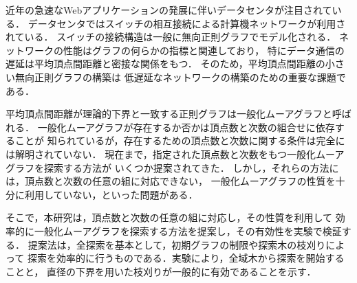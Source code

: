 
近年の急速なWebアプリケーションの発展に伴いデータセンタが注目されている．
データセンタではスイッチの相互接続による計算機ネットワークが利用されている．
スイッチの接続構造は一般に無向正則グラフでモデル化される．
ネットワークの性能はグラフの何らかの指標と関連しており，
特にデータ通信の遅延は平均頂点間距離と密接な関係をもつ．
そのため，平均頂点間距離の小さい無向正則グラフの構築は
低遅延なネットワークの構築のための重要な課題である．

平均頂点間距離が理論的下界と一致する正則グラフは一般化ムーアグラフと呼ばれる．
一般化ムーアグラフが存在するか否かは頂点数と次数の組合せに依存することが
知られているが，存在するための頂点数と次数に関する条件は完全には解明されていない．
現在まで，指定された頂点数と次数をもつ一般化ムーアグラフを探索する方法が
いくつか提案されてきた．
しかし，それらの方法には，頂点数と次数の任意の組に対応できない，
一般化ムーアグラフの性質を十分に利用していない，といった問題がある．

そこで，本研究は，頂点数と次数の任意の組に対応し，その性質を利用して
効率的に一般化ムーアグラフを探索する方法を提案し，その有効性を実験で検証する．
提案法は，全探索を基本として，初期グラフの制限や探索木の枝刈りによって
探索を効率的に行うものである．実験により，全域木から探索を開始することと，
直径の下界を用いた枝刈りが一般的に有効であることを示す．
